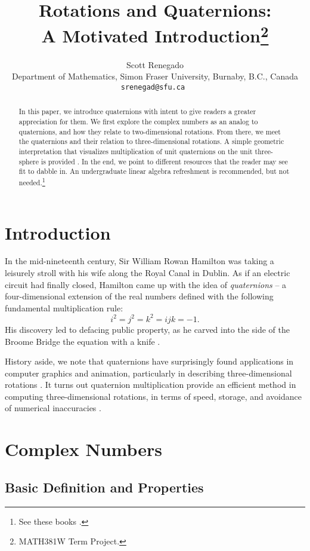 \documentclass[12pt]{article}
\title{Rotations and Quaternions: \\
    \large A Motivated Introduction\thanks{MATH381W Term Project.}}
\author{Scott Renegado\\ Department of Mathematics, Simon Fraser University, Burnaby, B.C., Canada\\ \tt{srenegad@sfu.ca} }
\date{}
\theoremstyle{plain}
\theoremstyle{definition}
\begin{document}
\maketitle

\begin{abstract}
In this paper, we introduce quaternions with intent to give readers a greater appreciation for them. We first explore the complex numbers as an analog to quaternions, and how they relate to two-dimensional rotations. From there, we meet the quaternions and their relation to three-dimensional rotations. A simple geometric interpretation that visualizes multiplication of unit quaternions on the unit three-sphere is provided \cite{hanson}. In the end, we point to different resources that the reader may see fit to dabble in. An undergraduate linear algebra refreshment is recommended, but not needed.\footnote{See these books \cite{anton, axler}.}
\end{abstract}

\section{Introduction}
In the mid-nineteenth century, Sir William Rowan Hamilton was taking a leisurely stroll with his wife along the Royal Canal in Dublin. As if an electric circuit had finally closed, Hamilton came up with the idea of \textit{quaternions} -- a four-dimensional extension of the real numbers defined with the following fundamental multiplication rule:  
\begin{equation*}
    \textit{i}^2 = \textit{j}^2 = \textit{k}^2 = \textit{ijk} = -1.
\end{equation*}
His discovery led to defacing public property, as he carved into the side of the Broome Bridge the equation with a knife \cite{hanson}. 

History aside, we note that quaternions have surprisingly found applications in computer graphics and animation, particularly in describing three-dimensional rotations \cite{goldman, hanson}. It turns out quaternion multiplication provide an efficient method in computing three-dimensional rotations, in terms of speed, storage, and avoidance of numerical inaccuracies \cite{goldman}.

\section{Complex Numbers}
\label{complex}

\subsection{Basic Definition and Properties}
\label{complexDefn}
\end{document}
